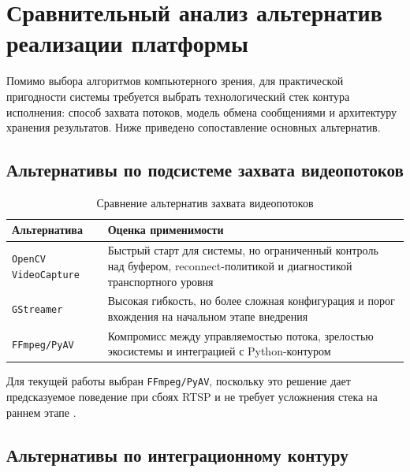 \section{Сравнительный анализ альтернатив реализации платформы}

Помимо выбора алгоритмов компьютерного зрения, для практической пригодности системы требуется выбрать технологический стек контура исполнения: способ захвата потоков, модель обмена сообщениями и архитектуру хранения результатов. Ниже приведено сопоставление основных альтернатив.

\subsection{Альтернативы по подсистеме захвата видеопотоков}

\begin{table}[H]
\caption{Сравнение альтернатив захвата видеопотоков}
\label{tab:capture_alternatives}
\begin{tabularx}{\textwidth}{>{\raggedright\arraybackslash}p{}X}
\toprule
Альтернатива & Оценка применимости \\
\midrule
\texttt{OpenCV VideoCapture} & Быстрый старт для системы, но ограниченный контроль над буфером, reconnect-политикой и диагностикой транспортного уровня \\
\texttt{GStreamer} & Высокая гибкость, но более сложная конфигурация и порог вхождения на начальном этапе внедрения \\
\texttt{FFmpeg/PyAV} & Компромисс между управляемостью потока, зрелостью экосистемы и интеграцией с Python-контуром \\
\bottomrule
\end{tabularx}
\end{table}

Для текущей работы выбран \texttt{FFmpeg/PyAV}, поскольку это решение дает предсказуемое поведение при сбоях RTSP и не требует усложнения стека на раннем этапе \cite{ffmpeg_docs,pyav_docs}.

\subsection{Альтернативы по интеграционному контуру}

